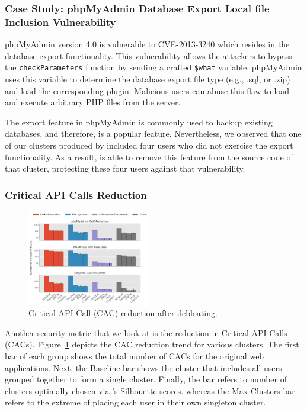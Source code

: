 \subsubsection{Case Study: phpMyAdmin Database Export Local file Inclusion Vulnerability}

phpMyAdmin version 4.0 is vulnerable to CVE-2013-3240 which resides in the database export functionality. 
This vulnerability allows the attackers to bypass the \texttt{checkParameters} function by sending a crafted \texttt{\$what} variable. 
phpMyAdmin uses this variable to determine the database export file type (e.g., .sql, or .zip) and load the corresponding plugin. 
Malicious users can abuse this flaw to load and execute arbitrary PHP files from the server. 

The export feature in phpMyAdmin is commonly used to backup existing databases, and therefore, is a popular feature. 
Nevertheless, we observed that one of our clusters produced by \sys{} included four users who did not exercise the export functionality. As a result, \sys{} is able to remove this feature from the source code of that cluster, protecting these four users against that vulnerability. 

\subsubsection{Critical API Calls Reduction}

\begin{figure}[t]
    \centering
    \includegraphics[width=0.48\textwidth]{figures/dbltr/cac_reduction.pdf}
    \caption{Critical API Call (CAC) reduction after debloating.}
    \label{fig:cac_reduction}
\end{figure}

Another security metric that we look at is the reduction in Critical API Calls (CACs). 
Figure~\ref{fig:cac_reduction} depicts the CAC reduction trend for various clusters. 
The first bar of each group shows the total number of CACs for the original web applications.
Next, the Baseline bar shows the cluster that includes all users grouped together to form a single cluster. 
Finally, the \sys{} bar refers to number of clusters optimally chosen via \sys{}'s Silhouette scores. whereas the Max Clusters bar refers to the extreme of placing each user in their own singleton cluster.

